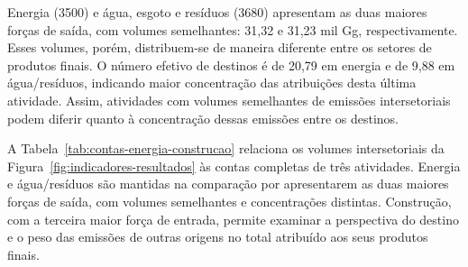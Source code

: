 Energia (3500) e água, esgoto e resíduos (3680) apresentam as duas maiores forças de saída, com volumes semelhantes: 31,32 e 31,23 mil Gg, respectivamente. Esses volumes, porém, distribuem-se de maneira diferente entre os setores de produtos finais. O número efetivo de destinos é de 20,79 em energia e de 9,88 em água/resíduos, indicando maior concentração das atribuições desta última atividade. Assim, atividades com volumes semelhantes de emissões intersetoriais podem diferir quanto à concentração dessas emissões entre os destinos.

A Tabela~\ref{tab:contas-energia-construcao} relaciona os volumes intersetoriais da Figura~\ref{fig:indicadores-resultados} às contas completas de três atividades. Energia e água/resíduos são mantidas na comparação por apresentarem as duas maiores forças de saída, com volumes semelhantes e concentrações distintas. Construção, com a terceira maior força de entrada, permite examinar a perspectiva do destino e o peso das emissões de outras origens no total atribuído aos seus produtos finais.

